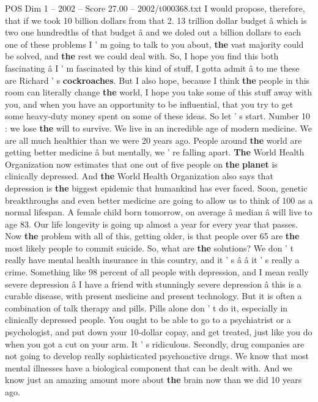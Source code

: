 \begin{textsample}{POS Dim 1 – 2002 – Score 27.00 – 2002/t000368.txt}
I would propose, therefore, that if we took 10 billion dollars from that 2. 13 trillion dollar budget â which is two one hundredths of that budget â and we doled out a billion dollars to each one of these problems I ' m going to talk to you about, \textbf{the} vast majority could be solved, and \textbf{the} rest we could deal with.
So, I hope you find this both fascinating â I ' m fascinated by this kind of stuff, I gotta admit â to me these are Richard ' s \textbf{cockroaches}.
But I also hope, because I think \textbf{the} people in this room can literally change \textbf{the} world, I hope you take some of this stuff away with you, and when you have an opportunity to be influential, that you try to get some heavy-duty money spent on some of these ideas.
So let ' s start.
Number 10 : we lose \textbf{the} will to survive.
We live in an incredible age of modern medicine.
We are all much healthier than we were 20 years ago.
People around \textbf{the} world are getting better medicine â but mentally, we ' re falling apart. \textbf{The} World Health Organization now estimates that one out of five people on \textbf{the} \textbf{planet} is clinically depressed.
And \textbf{the} World Health Organization also says that depression is \textbf{the} biggest epidemic that humankind has ever faced.
Soon, genetic breakthroughs and even better medicine are going to allow us to think of 100 as a normal lifespan.
A female child born tomorrow, on average â median â will live to age 83.
Our life longevity is going up almost a year for every year that passes.
Now \textbf{the} problem with all of this, getting older, is that people over 65 are \textbf{the} most likely people to commit suicide.
So, what are \textbf{the} solutions?
We don ' t really have mental health insurance in this country, and it ' s â â it ' s really a crime.
Something like 98 percent of all people with depression, and I mean really severe depression â I have a friend with stunningly severe depression â this is a curable disease, with present medicine and present technology.
But it is often a combination of talk therapy and pills.
Pills alone don ' t do it, especially in clinically depressed people.
You ought to be able to go to a psychiatrist or a psychologist, and put down your 10-dollar copay, and get treated, just like you do when you got a cut on your arm.
It ' s ridiculous.
Secondly, drug companies are not going to develop really sophisticated psychoactive drugs.
We know that most mental illnesses have a biological component that can be dealt with.
And we know just an amazing amount more about \textbf{the} brain now than we did 10 years ago.

\end{textsample}
